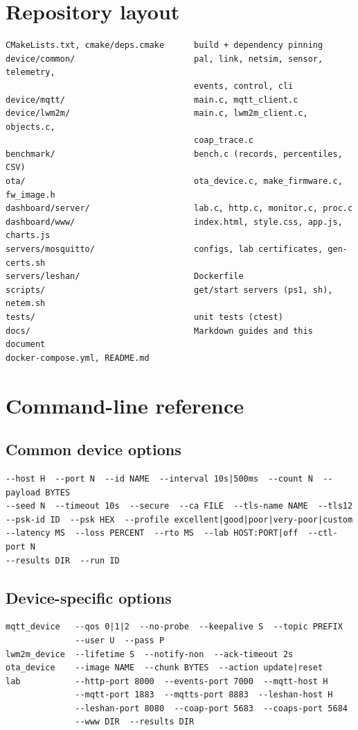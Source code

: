 \documentclass[11pt,a4paper]{article}
\begin{document}
\appendix
\section{Repository layout}
\begin{lstlisting}
CMakeLists.txt, cmake/deps.cmake      build + dependency pinning
device/common/                        pal, link, netsim, sensor, telemetry,
                                      events, control, cli
device/mqtt/                          main.c, mqtt_client.c
device/lwm2m/                         main.c, lwm2m_client.c, objects.c,
                                      coap_trace.c
benchmark/                            bench.c (records, percentiles, CSV)
ota/                                  ota_device.c, make_firmware.c, fw_image.h
dashboard/server/                     lab.c, http.c, monitor.c, proc.c
dashboard/www/                        index.html, style.css, app.js, charts.js
servers/mosquitto/                    configs, lab certificates, gen-certs.sh
servers/leshan/                       Dockerfile
scripts/                              get/start servers (ps1, sh), netem.sh
tests/                                unit tests (ctest)
docs/                                 Markdown guides and this document
docker-compose.yml, README.md
\end{lstlisting}

\section{Command-line reference}
\subsection*{Common device options}
\begin{lstlisting}
--host H  --port N  --id NAME  --interval 10s|500ms  --count N  --payload BYTES
--seed N  --timeout 10s  --secure  --ca FILE  --tls-name NAME  --tls12
--psk-id ID  --psk HEX  --profile excellent|good|poor|very-poor|custom
--latency MS  --loss PERCENT  --rto MS  --lab HOST:PORT|off  --ctl-port N
--results DIR  --run ID
\end{lstlisting}
\subsection*{Device-specific options}
\begin{lstlisting}
mqtt_device   --qos 0|1|2  --no-probe  --keepalive S  --topic PREFIX
              --user U  --pass P
lwm2m_device  --lifetime S  --notify-non  --ack-timeout 2s
ota_device    --image NAME  --chunk BYTES  --action update|reset
lab           --http-port 8000  --events-port 7000  --mqtt-host H
              --mqtt-port 1883  --mqtts-port 8883  --leshan-host H
              --leshan-port 8080  --coap-port 5683  --coaps-port 5684
              --www DIR  --results DIR
\end{lstlisting}
\end{document}
